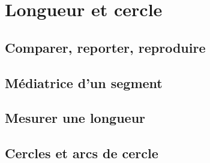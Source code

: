 \newpage

\section{Longueur et cercle}

\subsection{Comparer, reporter, reproduire}

\subsection{Médiatrice d’un segment}

\subsection{Mesurer une longueur}

\subsection{Cercles et arcs de cercle}
